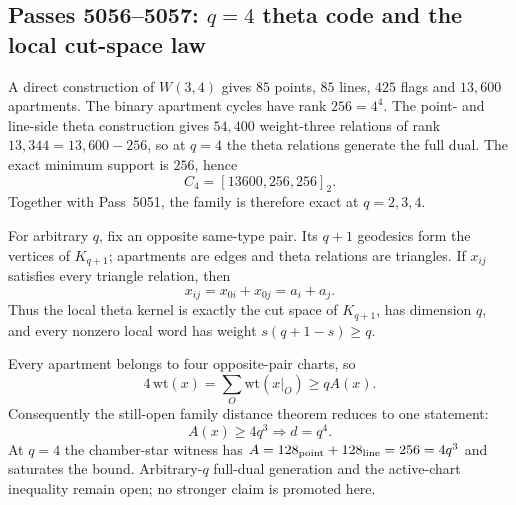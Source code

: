 \subsection*{Passes 5056--5057: $q=4$ theta code and the local cut-space law}
A direct construction of $W(3,4)$ gives $85$ points, $85$ lines, $425$ flags and $13{,}600$ apartments.  The binary apartment cycles have rank $256=4^4$.  The point- and line-side theta construction gives $54{,}400$ weight-three relations of rank $13{,}344=13{,}600-256$, so at $q=4$ the theta relations generate the full dual.  The exact minimum support is $256$, hence
\[
\boxed{C_4=[13600,256,256]_2}.
\]
Together with Pass~5051, the family is therefore exact at $q=2,3,4$.

For arbitrary $q$, fix an opposite same-type pair.  Its $q+1$ geodesics form the vertices of $K_{q+1}$; apartments are edges and theta relations are triangles.  If $x_{ij}$ satisfies every triangle relation, then
\[
x_{ij}=x_{0i}+x_{0j}=a_i+a_j.
\]
Thus the local theta kernel is exactly the cut space of $K_{q+1}$, has dimension $q$, and every nonzero local word has weight $s(q+1-s)\ge q$.

Every apartment belongs to four opposite-pair charts, so
\[
4\,\mathrm{wt}(x)=\sum_O\mathrm{wt}(x|_O)\ge qA(x).
\]
Consequently the still-open family distance theorem reduces to one statement:
\[
\boxed{A(x)\ge4q^3\Longrightarrow d=q^4}.
\]
At $q=4$ the chamber-star witness has $A=128_{\rm point}+128_{\rm line}=256=4q^3$ and saturates the bound.  Arbitrary-$q$ full-dual generation and the active-chart inequality remain open; no stronger claim is promoted here.
